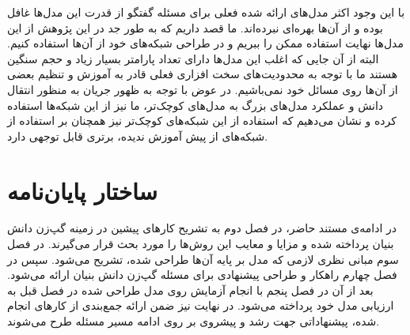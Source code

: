 با این وجود اکثر مدل‌های ارائه شده فعلی برای مسئله گفتگو از قدرت این مدل‌ها غافل بوده و از آن‌ها بهره‌ای نبرده‌اند. ما قصد داریم که به طور جد در این پژوهش از این مدل‌ها نهایت استفاده ممکن را ببریم و در طراحی شبکه‌های خود از آن‌ها استفاده کنیم. البته از آن جایی که اغلب این مدل‌ها دارای تعداد پارامتر بسیار زیاد و حجم سنگین هستند ما با توجه به محدودیت‌های سخت افزاری فعلی قادر به آموزش و تنظیم بعضی از آن‌ها روی مسائل خود نمی‌باشیم. در عوض با توجه به ظهور جریان 
به منظور انتقال دانش و عملکرد مدل‌های بزرگ به مدل‌‌های کوچک‌تر، ما نیز از این شبکه‌ها استفاده کرده و نشان می‌دهیم که استفاده از این شبکه‌های کوچک‌تر نیز همچنان بر استفاده از شبکه‌های از پیش آموزش ندیده، برتری قابل توجهی دارد.

\section{ساختار پایان‌نامه}

در ادامه‌ی مستند حاضر، در فصل دوم به تشریح کارهای پیشین در زمینه گپ‌زن دانش بنیان پرداخته شده و مزایا و معایب این روش‌ها را مورد بحث قرار می‌گیرند. در فصل سوم مبانی نظری لازمی که مدل بر پایه‌ آن‌ها طراحی شده، تشریح می‌شود. سپس در فصل چهارم راهکار و طراحی پیشنهادی برای مسئله گپ‌زن دانش بنیان ارائه می‌شود. بعد از آن در فصل پنجم با انجام آزمایش‌ روی مدل طراحی شده در فصل قبل به ارزیابی مدل خود پرداخته می‌شود. در نهایت نیز ضمن ارائه جمع‌بندی از کار‌های انجام شده، پیشنهاداتی جهت رشد و پیشروی بر روی ادامه مسیر مسئله طرح می‌شوند.
